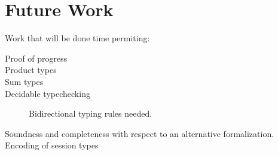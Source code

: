 \documentclass[a4paper,UKenglish,cleveref, autoref, thm-restate,authorcolumns]{lipics-v2019}
\theoremstyle{definition}
\begin{document}
\cite{typing-with-leftovers}

\cite{Higher-inductive-types-for-congruence}

\cite{LTS-semantics}

\cite{work-on-session-types}


\section{Future Work}

Work that will be done time permiting:

\begin{description}

\item [Proof of progress]

\item [Product types]

\item [Sum types]

\item [Decidable typechecking]

  Bidirectional typing rules needed.

\item [Soundness and completeness with respect to an alternative formalization.]

\item [Encoding of session types]

\end{description}



\end{document}
